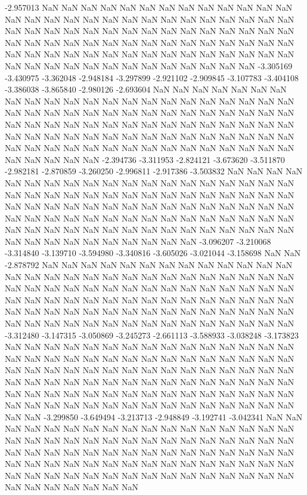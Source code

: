 -2.957013
NaN
NaN
NaN
NaN
NaN
NaN
NaN
NaN
NaN
NaN
NaN
NaN
NaN
NaN
NaN
NaN
NaN
NaN
NaN
NaN
NaN
NaN
NaN
NaN
NaN
NaN
NaN
NaN
NaN
NaN
NaN
NaN
NaN
NaN
NaN
NaN
NaN
NaN
NaN
NaN
NaN
NaN
NaN
NaN
NaN
NaN
NaN
NaN
NaN
NaN
NaN
NaN
NaN
NaN
NaN
NaN
NaN
NaN
NaN
NaN
NaN
NaN
NaN
NaN
NaN
NaN
NaN
NaN
NaN
NaN
NaN
NaN
NaN
NaN
NaN
NaN
NaN
NaN
NaN
NaN
NaN
NaN
NaN
NaN
NaN
NaN
-3.305169
-3.430975
-3.362048
-2.948184
-3.297899
-2.921102
-2.909845
-3.107783
-3.404108
-3.386038
-3.865840
-2.980126
-2.693604
NaN
NaN
NaN
NaN
NaN
NaN
NaN
NaN
NaN
NaN
NaN
NaN
NaN
NaN
NaN
NaN
NaN
NaN
NaN
NaN
NaN
NaN
NaN
NaN
NaN
NaN
NaN
NaN
NaN
NaN
NaN
NaN
NaN
NaN
NaN
NaN
NaN
NaN
NaN
NaN
NaN
NaN
NaN
NaN
NaN
NaN
NaN
NaN
NaN
NaN
NaN
NaN
NaN
NaN
NaN
NaN
NaN
NaN
NaN
NaN
NaN
NaN
NaN
NaN
NaN
NaN
NaN
NaN
NaN
NaN
NaN
NaN
NaN
NaN
NaN
NaN
NaN
NaN
NaN
NaN
NaN
NaN
NaN
NaN
NaN
NaN
NaN
-2.394736
-3.311953
-2.824121
-3.673620
-3.511870
-2.982181
-2.870859
-3.260250
-2.996811
-2.917386
-3.503832
NaN
NaN
NaN
NaN
NaN
NaN
NaN
NaN
NaN
NaN
NaN
NaN
NaN
NaN
NaN
NaN
NaN
NaN
NaN
NaN
NaN
NaN
NaN
NaN
NaN
NaN
NaN
NaN
NaN
NaN
NaN
NaN
NaN
NaN
NaN
NaN
NaN
NaN
NaN
NaN
NaN
NaN
NaN
NaN
NaN
NaN
NaN
NaN
NaN
NaN
NaN
NaN
NaN
NaN
NaN
NaN
NaN
NaN
NaN
NaN
NaN
NaN
NaN
NaN
NaN
NaN
NaN
NaN
NaN
NaN
NaN
NaN
NaN
NaN
NaN
NaN
NaN
NaN
NaN
NaN
NaN
NaN
NaN
NaN
NaN
NaN
NaN
NaN
NaN
-3.096207
-3.210068
-3.314840
-3.139710
-3.594980
-3.340816
-3.605026
-3.021044
-3.158698
NaN
NaN
-2.878792
NaN
NaN
NaN
NaN
NaN
NaN
NaN
NaN
NaN
NaN
NaN
NaN
NaN
NaN
NaN
NaN
NaN
NaN
NaN
NaN
NaN
NaN
NaN
NaN
NaN
NaN
NaN
NaN
NaN
NaN
NaN
NaN
NaN
NaN
NaN
NaN
NaN
NaN
NaN
NaN
NaN
NaN
NaN
NaN
NaN
NaN
NaN
NaN
NaN
NaN
NaN
NaN
NaN
NaN
NaN
NaN
NaN
NaN
NaN
NaN
NaN
NaN
NaN
NaN
NaN
NaN
NaN
NaN
NaN
NaN
NaN
NaN
NaN
NaN
NaN
NaN
NaN
NaN
NaN
NaN
NaN
NaN
NaN
NaN
NaN
NaN
NaN
NaN
-3.312480
-3.147315
-3.050869
-3.245273
-2.661113
-3.588933
-3.038248
-3.173823
NaN
NaN
NaN
NaN
NaN
NaN
NaN
NaN
NaN
NaN
NaN
NaN
NaN
NaN
NaN
NaN
NaN
NaN
NaN
NaN
NaN
NaN
NaN
NaN
NaN
NaN
NaN
NaN
NaN
NaN
NaN
NaN
NaN
NaN
NaN
NaN
NaN
NaN
NaN
NaN
NaN
NaN
NaN
NaN
NaN
NaN
NaN
NaN
NaN
NaN
NaN
NaN
NaN
NaN
NaN
NaN
NaN
NaN
NaN
NaN
NaN
NaN
NaN
NaN
NaN
NaN
NaN
NaN
NaN
NaN
NaN
NaN
NaN
NaN
NaN
NaN
NaN
NaN
NaN
NaN
NaN
NaN
NaN
NaN
NaN
NaN
NaN
NaN
NaN
NaN
NaN
NaN
-3.299850
-3.649494
-3.213713
-2.948849
-3.192741
-3.042341
NaN
NaN
NaN
NaN
NaN
NaN
NaN
NaN
NaN
NaN
NaN
NaN
NaN
NaN
NaN
NaN
NaN
NaN
NaN
NaN
NaN
NaN
NaN
NaN
NaN
NaN
NaN
NaN
NaN
NaN
NaN
NaN
NaN
NaN
NaN
NaN
NaN
NaN
NaN
NaN
NaN
NaN
NaN
NaN
NaN
NaN
NaN
NaN
NaN
NaN
NaN
NaN
NaN
NaN
NaN
NaN
NaN
NaN
NaN
NaN
NaN
NaN
NaN
NaN
NaN
NaN
NaN
NaN
NaN
NaN
NaN
NaN
NaN
NaN
NaN
NaN
NaN
NaN
NaN
NaN
NaN
NaN
NaN
NaN
